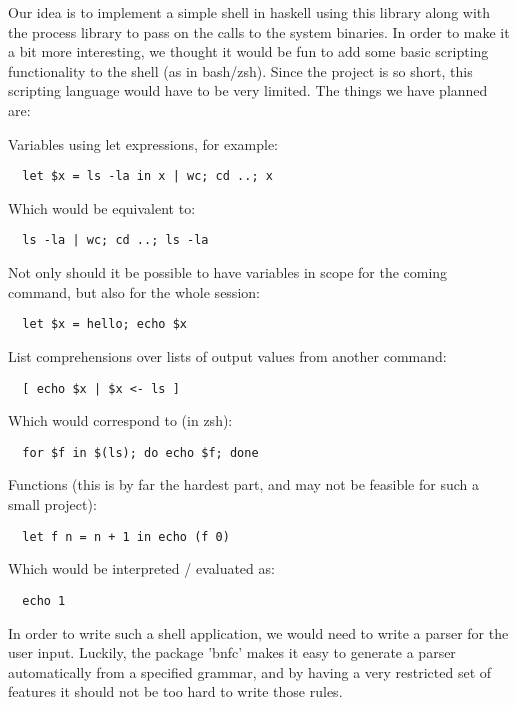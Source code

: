 \documentclass[11pt,a4paper]{article}
\begin{document}
Our idea is to implement a simple shell in haskell using this library along with
the process library to pass on the calls to the system binaries. In order to
make it a bit more interesting, we thought it would be fun to add some basic
scripting functionality to the shell (as in bash/zsh). Since the project is so
short, this scripting language would have to be very limited. The things we have
planned are:

Variables using let expressions, for example:
\begin{verbatim}
  let $x = ls -la in x | wc; cd ..; x
\end{verbatim}

Which would be equivalent to:

\begin{verbatim}
  ls -la | wc; cd ..; ls -la
\end{verbatim}

Not only should it be possible to have variables in scope for the coming
command, but also for the whole session:

\begin{verbatim}
  let $x = hello; echo $x
\end{verbatim}

List comprehensions over lists of output values from another command:

\begin{verbatim}
  [ echo $x | $x <- ls ]
\end{verbatim}

Which would correspond to (in zsh):

\begin{verbatim}
  for $f in $(ls); do echo $f; done
\end{verbatim}

Functions (this is by far the hardest part, and may not be feasible for such a small project):

\begin{verbatim}
  let f n = n + 1 in echo (f 0)
\end{verbatim}

Which would be interpreted / evaluated as:

\begin{verbatim}
  echo 1
\end{verbatim}

In order to write such a shell application, we would need to write a parser for
the user input. Luckily, the package 'bnfc' makes it easy to generate a parser
automatically from a specified grammar, and by having a very restricted set of
features it should not be too hard to write those rules.
\end{document}
